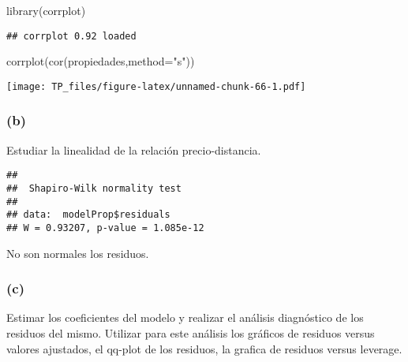 \documentclass[
]{article}
\newenvironment{Shaded}{\begin{snugshade}}{\end{snugshade}}
\newcommand{\AttributeTok}[1]{\textcolor[rgb]{0.77,0.63,0.00}{#1}}
\newcommand{\FunctionTok}[1]{\textcolor[rgb]{0.00,0.00,0.00}{#1}}
\newcommand{\NormalTok}[1]{#1}
\newcommand{\OtherTok}[1]{\textcolor[rgb]{0.56,0.35,0.01}{#1}}
\newcommand{\SpecialCharTok}[1]{\textcolor[rgb]{0.00,0.00,0.00}{#1}}
\newcommand{\StringTok}[1]{\textcolor[rgb]{0.31,0.60,0.02}{#1}}
\begin{document}
\begin{Shaded}
\begin{Highlighting}[]
\FunctionTok{library}\NormalTok{(corrplot)}
\end{Highlighting}
\end{Shaded}

\begin{verbatim}
## corrplot 0.92 loaded
\end{verbatim}

\begin{Shaded}
\begin{Highlighting}[]
\FunctionTok{corrplot}\NormalTok{(}\FunctionTok{cor}\NormalTok{(propiedades,}\AttributeTok{method=}\StringTok{"s"}\NormalTok{))}
\end{Highlighting}
\end{Shaded}

\texttt{[image: TP\_files/figure-latex/unnamed-chunk-66-1.pdf]}

\hypertarget{b-4}{%
\subsubsection{(b)}\label{b-4}}

Estudiar la linealidad de la relación precio-distancia.

\begin{Shaded}
\end{Shaded}

\begin{verbatim}
## 
##  Shapiro-Wilk normality test
## 
## data:  modelProp$residuals
## W = 0.93207, p-value = 1.085e-12
\end{verbatim}

No son normales los residuos.

\hypertarget{c-4}{%
\subsubsection{(c)}\label{c-4}}

Estimar los coeficientes del modelo y realizar el análisis diagnóstico
de los residuos del mismo. Utilizar para este análisis los gráficos de
residuos versus valores ajustados, el qq-plot de los residuos, la
grafica de residuos versus leverage.
\end{document}
